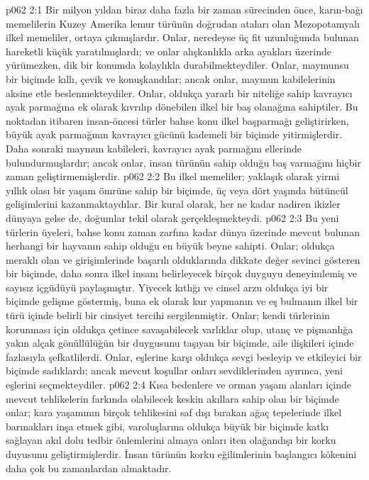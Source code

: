 \vs p062 2:1 Bir milyon yıldan biraz daha fazla bir zaman sürecinden önce, karın\hyp{}bağı memelilerin Kuzey Amerika lemur türünün doğrudan ataları olan Mezopotamyalı ilkel memeliler,  ortaya çıkmışlardır. Onlar, neredeyse üç fit uzunluğunda bulunan hareketli küçük yaratılmışlardı; ve onlar alışkanlıkla arka ayakları üzerinde yürümezken, dik bir konumda kolaylıkla durabilmekteydiler. Onlar, maymunsu bir biçimde kıllı, çevik ve konuşkandılar; ancak onlar, maymun kabilelerinin aksine etle beslenmekteydiler. Onlar, oldukça yararlı bir niteliğe sahip kavrayıcı ayak parmağına ek olarak kıvrılıp dönebilen ilkel bir baş olanağına sahiptiler. Bu noktadan itibaren insan\hyp{}öncesi türler bahse konu ilkel başparmağı geliştirirken, büyük ayak parmağının kavrayıcı gücünü kademeli bir biçimde yitirmişlerdir. Daha sonraki maymun kabileleri, kavrayıcı ayak parmağını ellerinde bulundurmuşlardır; ancak onlar, insan türünün sahip olduğu baş varmağını hiçbir zaman geliştirmemişlerdir.
\vs p062 2:2 Bu ilkel memeliler; yaklaşık olarak yirmi yıllık olası bir yaşam ömrüne sahip bir biçimde, üç veya dört yaşında bütüncül gelişimlerini kazanmaktaydılar. Bir kural olarak, her ne kadar nadiren ikizler dünyaya gelse de, doğumlar tekil olarak gerçekleşmekteydi.
\vs p062 2:3 Bu yeni türlerin üyeleri, bahse konu zaman zarfına kadar dünya üzerinde mevcut bulunan herhangi bir hayvanın sahip olduğu en büyük beyne sahipti. Onlar; oldukça meraklı olan ve girişimlerinde başarılı olduklarında dikkate değer sevinci gösteren bir biçimde, daha sonra ilkel insanı belirleyecek birçok duyguyu deneyimlemiş ve sayısız içgüdüyü paylaşmıştır. Yiyecek kıtlığı ve cinsel arzu oldukça iyi bir biçimde gelişme göstermiş, buna ek olarak kur yapmanın ve eş bulmanın ilkel bir türü içinde belirli bir cinsiyet tercihi sergilenmiştir. Onlar; kendi türlerinin korunması için oldukça çetince savaşabilecek varlıklar olup, utanç ve pişmanlığa yakın alçak gönüllülüğün bir duygusunu taşıyan bir biçimde, aile ilişkileri içinde fazlasıyla şefkatlilerdi. Onlar, eşlerine karşı oldukça sevgi besleyip ve etkileyici bir biçimde sadıklardı; ancak mevcut koşullar onları sevdiklerinden ayırınca, yeni eşlerini seçmekteydiler.
\vs p062 2:4 Kısa bedenlere ve orman yaşam alanları içinde mevcut tehlikelerin farkında olabilecek keskin akıllara sahip olan bir biçimde onlar; kara yaşamının birçok tehlikesini saf dışı bırakan ağaç tepelerinde ilkel barınakları inşa etmek gibi, varoluşlarına oldukça büyük bir biçimde katkı sağlayan akıl dolu tedbir önlemlerini almaya onları iten olağandışı bir korku duyusunu geliştirmişlerdir. İnsan türünün korku eğilimlerinin başlangıcı kökenini daha çok bu zamanlardan almaktadır.
